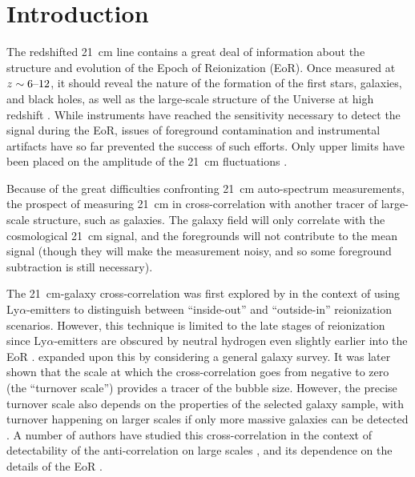 \documentclass[a4paper,fleqn,usenatbib]{mnras}
\begin{document}
\section{Introduction} \label{sec:intro}
The redshifted 21~cm line contains a great deal of information about the
structure and evolution of the Epoch of Reionization (EoR). Once measured at
$z\sim6\textup{--}12$, it should reveal the nature of the formation of the
first stars, galaxies, and black holes, as well as the large-scale structure
of the Universe at high redshift \citep{2013fgu..book.....L}. While
instruments have reached the sensitivity necessary to detect the signal during
the EoR, issues of foreground contamination and instrumental artifacts have so
far prevented the success of such efforts. Only upper limits have been placed
on the amplitude of the 21~cm fluctuations \citep[e.g.][]{2013MNRAS.433..639P,
2014PhRvD..89b3002D, 2016ApJ...833..102B, 2017ApJ...838...65P}.

Because of the great difficulties confronting 21~cm auto-spectrum
measurements, the prospect of measuring 21~cm in cross-correlation with
another tracer of large-scale structure, such as galaxies. The galaxy field
will only correlate with the cosmological 21~cm signal, and the foregrounds
will not contribute to the mean signal (though they will make the measurement
noisy, and so some foreground subtraction is still necessary).

The 21~cm-galaxy cross-correlation was first explored by
\citet{2007MNRAS.375.1034W} in the context of using Ly$\alpha$-emitters to
distinguish between ``inside-out'' and ``outside-in'' reionization scenarios.
However, this technique is limited to the late stages of reionization since
Ly$\alpha$-emitters are obscured by neutral hydrogen even slightly earlier
into the EoR \citep[e.g.][]{2006ApJ...648....7K}. \citet{2007ApJ...660.1030F}
expanded upon this by considering a general galaxy survey. It was later shown
that the scale at which the cross-correlation goes from negative to zero (the
``turnover scale'') provides a tracer of the bubble size. However, the precise
turnover scale also depends on the properties of the selected galaxy sample,
with turnover happening on larger scales if only more massive galaxies can be
detected \citep{2009ApJ...690..252L}. A number of authors have studied this
cross-correlation in the context of detectability of the anti-correlation on
large scales \citep{2013MNRAS.432.2615W, 2016MNRAS.457..666V,
2017ApJ...836..176H}, and its dependence on the details of the EoR
\citep{2014MNRAS.438.2474P}.
\end{document}
